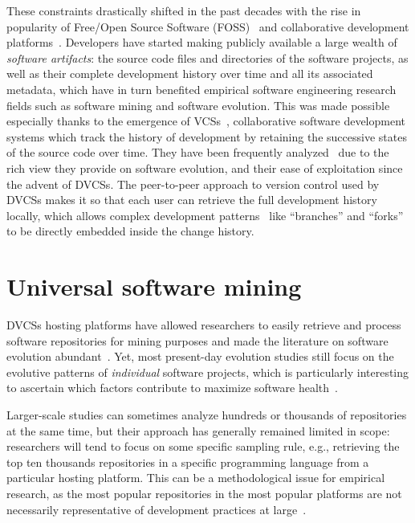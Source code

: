 These constraints drastically shifted in the past decades with the rise in
popularity of Free/Open Source Software
(FOSS)~\cite{syeed-2013-oss-evol-review} and collaborative development
platforms~\cite{dabbish2012socialcoding, kalliamvakou2014promises}. Developers
have started making publicly available a large wealth of \emph{software
artifacts}: the source code files and directories of the software projects, as
well as their complete development history over time and all its associated
metadata, which have in turn benefited empirical software engineering research
fields such as software mining and software evolution. This was made possible
especially thanks to the emergence of \glspl{VCS}~\cite{spinellis2005vcs},
collaborative software development systems which track the history of
development by retaining the successive states of the source code over time.
They have been frequently analyzed~\cite{kagdi2007msrsurvey} due to the rich
view they provide on software evolution, and their ease of exploitation since
the advent of \glspl{DVCS}. The peer-to-peer approach to version control used
by \glspl{DVCS} makes it so that each user can retrieve the full development
history locally, which allows complex development
patterns~\cite{gousios2014pullrequests,gousios2015work} like ``branches'' and
``forks'' to be directly embedded inside the change history.

\section{Universal software mining}%
\label{sec:universal-software-mining}

\glspl{DVCS} hosting platforms have allowed researchers to easily retrieve and
process software repositories for mining purposes and made the literature on
software evolution abundant~\cite{herraiz2013evolution}. Yet, most present-day
evolution studies still focus on the evolutive patterns of \emph{individual}
software projects, which is particularly interesting to ascertain which factors
contribute to maximize software health~\cite{DBLP:conf/icse/2018soheal}.

Larger-scale studies can sometimes analyze hundreds or thousands of
repositories at the same time, but their approach has generally remained
limited in scope: researchers will tend to focus on some specific sampling
rule, e.g., retrieving the top ten thousands repositories in a specific
programming language from a particular hosting platform. This can be a
methodological issue for empirical research, as the most popular repositories
in the most popular platforms are not necessarily representative of development
practices at large~\cite{trujillo2021penumbra}.

